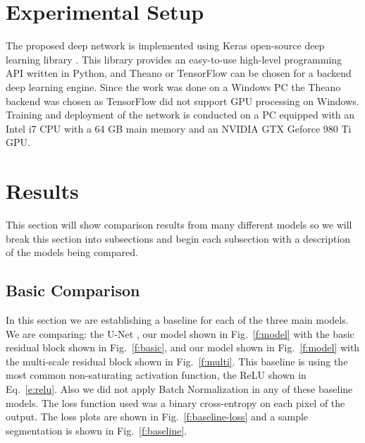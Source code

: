 \section{Experimental Setup}
The proposed deep network is implemented using Keras open-source deep learning library \cite{chollet2015}. This library provides an easy-to-use high-level programming API written in Python, and Theano or TensorFlow can be chosen for a backend deep learning engine. Since the work was done on a Windows PC the Theano backend was chosen as TensorFlow did not support GPU processing on Windows. Training and deployment of the network is conducted on a PC equipped with an Intel i7 CPU with a 64 GB main memory and an NVIDIA GTX Geforce 980 Ti GPU.

\section{Results}
This section will show comparison results from many different models so we will break this section into subsections and begin each subsection with a description of the models being compared. 

\subsection{Basic Comparison}
In this section we are establishing a baseline for each of the three main models. We are comparing: the U-Net \cite{ronneberger2015u}, our model shown in Fig.~\ref{f:model} with the basic residual block shown in Fig.~\ref{f:basic}, and our model shown in Fig.~\ref{f:model} with the multi-scale residual block shown in Fig.~\ref{f:multi}. This baseline is using the most common non-saturating activation function, the ReLU shown in Eq.~\ref{e:relu}. Also we did not apply Batch Normalization in any of these baseline models. The loss function used was a binary cross-entropy on each pixel of the output. The loss plots are shown in Fig.~\ref{f:baseline-loss} and a sample segmentation is shown in Fig.~\ref{f:baseline}.

